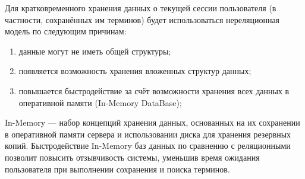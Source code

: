 Для кратковременного хранения данных о текущей сессии пользователя (в частности, сохранённых им терминов) будет использоваться нереляционная модель по следующим причинам:

\begin{enumerate}[label*=\arabic*)]
	\item данные могут не иметь общей структуры;
	\item появляется возможность хранения вложенных структур данных;
	\item повышается быстродействие за счёт возможности хранения всех данных в оперативной памяти (In-Memory DataBase);
	
\end{enumerate}

In-Memory --- набор концепций хранения данных, основанных на их сохранении в оперативной памяти сервера и использовании диска для хранения резервных копий. Быстродействие In-Memory баз данных по сравнению с реляционными позволит повысить отзывчивость системы, уменьшив время ожидания пользователя при выполнении сохранения и поиска терминов.



\pagebreak